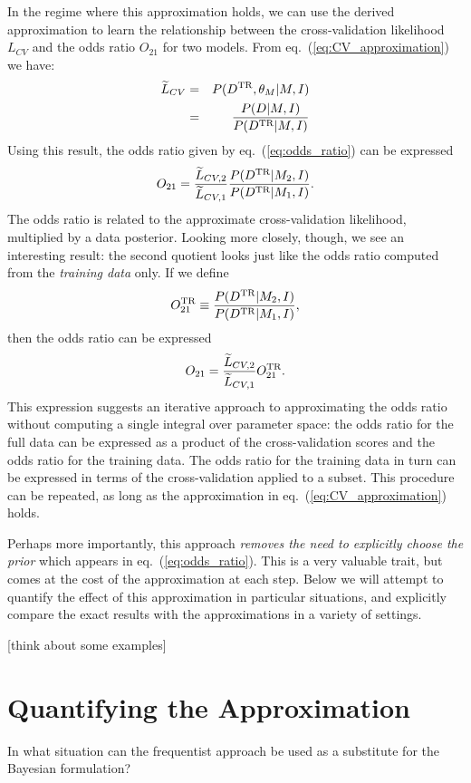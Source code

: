 \documentclass[12pt,pdftex]{article}
\newcommand{\Dtr}{\ensuremath{D^{\rm TR}}}
\newcommand{\eqn}[1]{eq.~(\ref{eq:#1})}
\begin{document}
In the regime where this approximation holds, we can use the derived
approximation to learn the relationship between the cross-validation
likelihood $L_{CV}$ and the odds ratio $O_{21}$ for two models.  From
\eqn{CV_approximation} we have:
\begin{eqnarray}
  \widetilde{L}_{CV} &=& P(\Dtr,\theta_M|M,I)\nonumber\\
                    &=& \frac{P(D|M, I)}{P(\Dtr|M, I)}
\end{eqnarray}
Using this result, the odds ratio given by \eqn{odds_ratio} can be expressed
\begin{equation}
  O_{21} = \frac{\widetilde{L}_{CV,2}}{\widetilde{L}_{CV,1}}
          \frac{P(\Dtr|M_2,I)}{P(\Dtr|M_1,I)}.
\end{equation}
The odds ratio is related to the approximate cross-validation likelihood,
multiplied by a data posterior.  Looking more closely, though, we see
an interesting result: the second quotient looks just like the odds
ratio computed from the {\it training data} only.  If we define
\begin{equation}
  O_{21}^{\rm TR} \equiv  \frac{P(\Dtr|M_2,I)}{P(\Dtr|M_1,I)},
\end{equation}
then the odds ratio can be expressed
\begin{equation}
  O_{21} = \frac{\widetilde{L}_{CV,2}}{\widetilde{L}_{CV,1}} O_{21}^{\rm TR}.
\end{equation}
This expression suggests an iterative approach to approximating the odds
ratio without computing a single integral over parameter space:
the odds ratio for the full data can be expressed as a product of the
cross-validation scores and the odds ratio for the training data. The
odds ratio for the training data in turn can be expressed in terms of
the cross-validation applied to a subset.  This procedure can be repeated,
as long as the approximation in \eqn{CV_approximation} holds.

Perhaps more importantly, this approach {\it removes the need to explicitly
choose the prior} which appears in \eqn{odds_ratio}.  This is a very valuable
trait, but comes at the cost of the approximation at each step.  Below we
will attempt to quantify the effect of this approximation in particular
situations, and explicitly compare the exact results with the approximations
in a variety of settings.

[think about some examples]

\section{Quantifying the Approximation}
In what situation can the frequentist approach be used as a substitute for
the Bayesian formulation?
\end{document}
